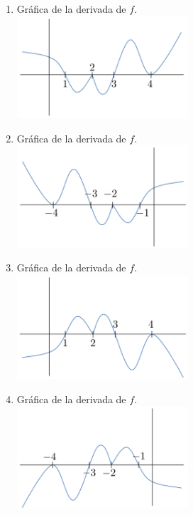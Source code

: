 \documentclass[12pt]{article}
\begin{document}
\begin{enumerate}[\hspace{9px} a)]
    \item Gr\'afica de la derivada de $f$.\\
        \includegraphics[width=0.5\textwidth]{ejer-a}
    \item Gr\'afica de la derivada de $f$.\\
        \includegraphics[width=0.5\textwidth]{ejer-b}
    \item Gr\'afica de la derivada de $f$.\\
        \includegraphics[width=0.5\textwidth]{ejer-c}
    \item Gr\'afica de la derivada de $f$.\\
        \includegraphics[width=0.5\textwidth]{ejer-d}
\end{enumerate}
\end{document}
